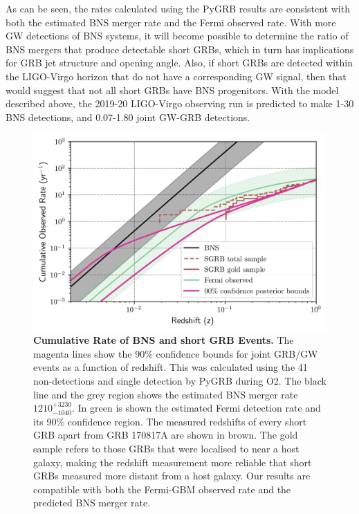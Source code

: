 \documentclass[11pt]{cuthesis}
\begin{document}
As can be seen, the rates calculated using the PyGRB results are consistent with both the estimated BNS merger rate and the Fermi observed rate. With more GW detections of BNS systems, it will become possible to determine the ratio of BNS mergers that produce detectable short GRBs, which in turn has implications for GRB jet structure and opening angle. Also, if short GRBs are detected within the LIGO-Virgo horizon that do not have a corresponding GW signal, then that would suggest that not all short GRBs have BNS progenitors. With the model described above, the 2019-20 LIGO-Virgo observing run is predicted to make 1-30 BNS detections, and 0.07-1.80 joint GW-GRB detections. \cite{o2grb}
\begin{figure}
\begin{center}
\includegraphics[width=0.9\linewidth]{cumulative_rate.png}
\end{center}
\caption{\textbf{Cumulative Rate of BNS and short GRB Events.} The magenta lines show the 90\% confidence bounds for joint GRB/GW events as a function of redshift. This was calculated using the 41 non-detections and single detection by PyGRB during O2. The black line and the grey region shows the estimated BNS  merger rate $1210^{+3230}_{-1040}$. In green is shown the estimated Fermi detection rate and its 90\% confidence region. \cite{Howell} The measured redshifts of every short GRB apart from GRB 170817A are shown in brown. The gold sample refers to those GRBs that were localised to near a host galaxy, making the redshift measurement more reliable that short GRBs measured more distant from a host galaxy. Our results are compatible with both the Fermi-GBM observed rate and the predicted BNS merger rate. \cite{o2grb}}
\label{fig:cum rate}
\end{figure}
\end{document}

